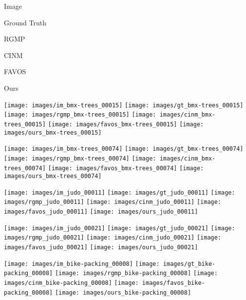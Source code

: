 \documentclass[10pt,twocolumn,letterpaper]{article}
\begin{document}
\begin{figure*}[!t]
  \centering
  \parbox{.14\textwidth}{\centering Image}
  \parbox{.14\textwidth}{\centering Ground Truth}
  \parbox{.14\textwidth}{\centering RGMP \cite{RGMP}}
  \parbox{.14\textwidth}{\centering CINM \cite{CINM}}
  \parbox{.14\textwidth}{\centering FAVOS \cite{FAVOS}}
  \parbox{.14\textwidth}{\centering Ours}

  \texttt{[image: images/im\_bmx-trees\_00015]}
  \texttt{[image: images/gt\_bmx-trees\_00015]}
  \texttt{[image: images/rgmp\_bmx-trees\_00015]}
  \texttt{[image: images/cinm\_bmx-trees\_00015]}
  \texttt{[image: images/favos\_bmx-trees\_00015]}
  \texttt{[image: images/ours\_bmx-trees\_00015]}
  
  \texttt{[image: images/im\_bmx-trees\_00074]}
  \texttt{[image: images/gt\_bmx-trees\_00074]}
  \texttt{[image: images/rgmp\_bmx-trees\_00074]}
  \texttt{[image: images/cinm\_bmx-trees\_00074]}
  \texttt{[image: images/favos\_bmx-trees\_00074]}
  \texttt{[image: images/ours\_bmx-trees\_00074]}
  
  \texttt{[image: images/im\_judo\_00011]}
  \texttt{[image: images/gt\_judo\_00011]}
  \texttt{[image: images/rgmp\_judo\_00011]}
  \texttt{[image: images/cinm\_judo\_00011]}
  \texttt{[image: images/favos\_judo\_00011]}
  \texttt{[image: images/ours\_judo\_00011]}
  
  \texttt{[image: images/im\_judo\_00021]}
  \texttt{[image: images/gt\_judo\_00021]}
  \texttt{[image: images/rgmp\_judo\_00021]}
  \texttt{[image: images/cinm\_judo\_00021]}
  \texttt{[image: images/favos\_judo\_00021]}
  \texttt{[image: images/ours\_judo\_00021]}
  
  \texttt{[image: images/im\_bike-packing\_00008]}
  \texttt{[image: images/gt\_bike-packing\_00008]}
  \texttt{[image: images/rgmp\_bike-packing\_00008]}
  \texttt{[image: images/cinm\_bike-packing\_00008]}
  \texttt{[image: images/favos\_bike-packing\_00008]}
  \texttt{[image: images/ours\_bike-packing\_00008]}
  

\end{figure*}
\end{document}
